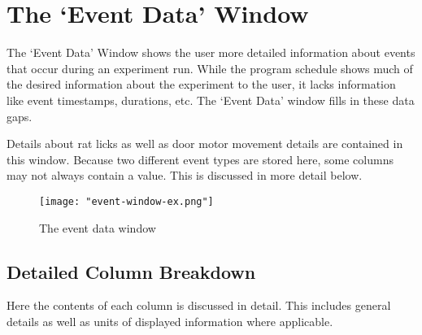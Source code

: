 \documentclass{article}
\begin{document}
\clearpage
\section{The `Event Data' Window}
\label{sec:event-data-window}
The `Event Data' Window shows the user more detailed information about events that occur during an experiment run. While the program schedule shows much of the desired 
information about the experiment to the user, it lacks information like event timestamps, durations, etc. The `Event Data' window fills in these data gaps. 

Details about rat licks as well as door motor movement details are contained in this window. Because two different event types are stored here, some columns may not always 
contain a value. This is discussed in more detail below.

\begin{figure}[h!]
    \centering
    \texttt{[image: "event-window-ex.png"]}
    \caption{The event data window }
    \label{fig:event-window-ex}
\end{figure}
\FloatBarrier

\subsection{Detailed Column Breakdown}
Here the contents of each column is discussed in detail. This includes general details as well as units of displayed information where applicable.
\end{document}
